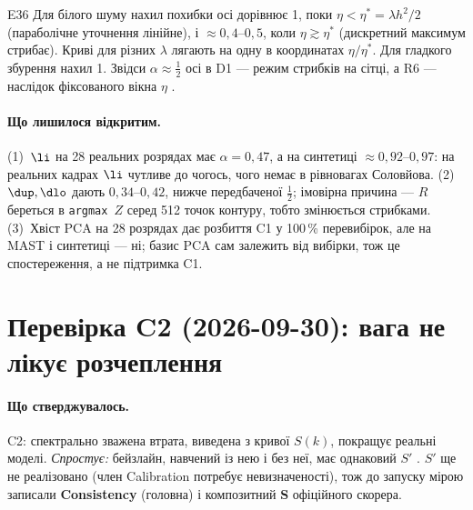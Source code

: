 \begin{established}{E36}
Для білого шуму нахил похибки осі дорівнює 1, поки $\eta<\eta^{*}=\lambda h^2/2$ (параболічне
уточнення лінійне), і $\approx0{,}4\text{--}0{,}5$, коли $\eta\gtrsim\eta^{*}$ (дискретний
максимум стрибає). Криві для різних $\lambda$ лягають на одну в координатах $\eta/\eta^{*}$.
Для гладкого збурення нахил 1. Звідси $\alpha\approx\tfrac12$ осі в D1 --- режим стрибків на
сітці, а R6 --- наслідок фіксованого вікна $\eta$ \cite{RegEst}.
\end{established}

\paragraph{Що лишилося відкритим.} (1)~$\li$ на 28 реальних розрядах має $\alpha=0{,}47$, а на
синтетиці $\approx0{,}92\text{--}0{,}97$: на реальних кадрах $\li$ чутливе до чогось, чого немає в
рівновагах Соловйова. (2)~$\dup,\dlo$ дають $0{,}34\text{--}0{,}42$, нижче передбаченої $\tfrac12$;
імовірна причина --- $R$ береться в \texttt{argmax}~$Z$ серед 512 точок контуру, тобто змінюється
стрибками. (3)~Хвіст PCA на 28 розрядах дає розбиття C1 у 100\,\% перевибірок, але на MAST і
синтетиці --- ні; базис PCA сам залежить від вибірки, тож це спостереження, а не підтримка C1.

\section{Перевірка C2 (2026-09-30): вага не лікує розчеплення}\label{sec:g02-c2}

\paragraph{Що стверджувалось.} C2: спектрально зважена втрата, виведена з кривої $S(k)$, покращує
реальні моделі. \emph{Спростує:} бейзлайн, навчений із нею і без неї, має однаковий $S'$
\cite{RegConj}. $S'$ ще не реалізовано (член Calibration потребує невизначеності), тож до запуску
мірою записали \textbf{Consistency} (головна) і композитний \textbf{S} офіційного скорера.

